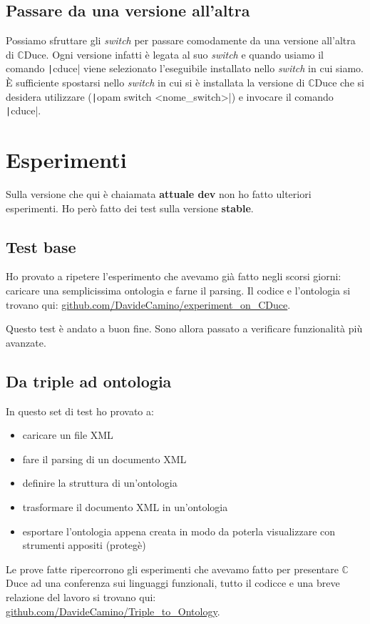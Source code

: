 \documentclass[]{article}
\newcommand{\cduce}{$\mathbb {C}$Duce\xspace}
\begin{document}
\subsection{Passare da una versione all'altra}
Possiamo sfruttare gli \textit{switch} per passare comodamente da una versione all'altra di \cduce. Ogni versione infatti è legata al suo \textit{switch} e quando usiamo il comando \texttt|cduce| viene selezionato l'eseguibile installato nello \textit{switch} in cui siamo. È sufficiente spostarsi nello \textit{switch} in cui si è installata la versione di \cduce che si desidera utilizzare (\texttt|opam switch <nome_switch>|) e invocare il comando \texttt|cduce|.

\section{Esperimenti}
Sulla versione che qui è chaiamata \textbf{attuale dev} non ho fatto ulteriori esperimenti. Ho però fatto dei test sulla versione \textbf{stable}.
\subsection{Test base}
Ho provato a ripetere l'esperimento che avevamo già fatto negli scorsi giorni: caricare una semplicissima ontologia e farne il parsing. Il codice e l'ontologia si trovano qui: \href{https://github.com/DavideCamino/experiment_on_CDuce/tree/main/Prove%20versioni%20CDuce/Codice}{github.com/DavideCamino/experiment\_on\_CDuce}.

Questo test è andato a buon fine. Sono allora passato a verificare funzionalità più avanzate.
\subsection{Da triple ad ontologia}
In questo set di test ho provato a:
\begin{itemize}
	\item caricare un file XML
	\item fare il parsing di un documento XML
	\item definire la struttura di un'ontologia
	\item trasformare il documento XML in un'ontologia
	\item esportare l'ontologia appena creata in modo da poterla visualizzare con strumenti appositi (protegè)
\end{itemize}
Le prove fatte ripercorrono gli esperimenti che avevamo fatto per presentare \cduce ad una conferenza sui linguaggi funzionali, tutto il codicce e una breve relazione del lavoro si trovano qui: \href{https://github.com/DavideCamino/Triple_to_Ontology}{github.com/DavideCamino/Triple\_to\_Ontology}.
\end{document}

